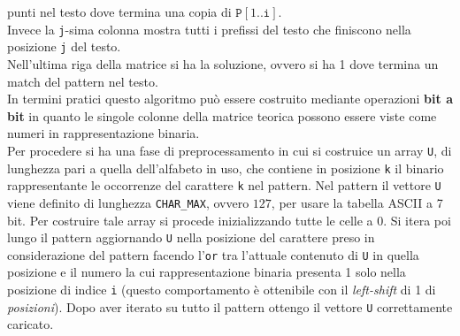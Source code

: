 \documentclass[a4paper,12pt, oneside]{article}
\begin{document}
punti nel testo dove termina una copia di
$\mathtt{P}[1..\mathtt{i}]$.\\
Invece la \texttt{j}-sima colonna mostra tutti i prefissi del testo
che finiscono nella posizione \texttt{j} del testo.\\
Nell'ultima riga della matrice si ha la soluzione, ovvero si ha 1 dove
termina un match del pattern nel testo.\\
In termini pratici questo algoritmo può essere costruito mediante
operazioni \textbf{bit a bit} in quanto le singole colonne della
matrice teorica possono essere viste come numeri in rappresentazione
binaria.\\
Per procedere si ha una fase di preprocessamento in cui si costruice
un array \texttt{U}, di lunghezza pari a quella dell'alfabeto in uso,
che contiene in posizione \texttt{k} il binario rappresentante le
occorrenze del carattere \texttt{k} nel pattern. Nel pattern il
vettore \texttt{U} viene definito di lunghezza \texttt{CHAR\_MAX},
ovvero $127$, per usare la tabella ASCII a 7 bit. Per costruire tale
array si procede inizializzando tutte le celle a 0. Si itera poi lungo
il pattern aggiornando \texttt{U} nella posizione del carattere preso
in considerazione del pattern facendo l'\texttt{or} tra l'attuale
contenuto di \texttt{U} in quella posizione e il numero la cui
rappresentazione binaria presenta 1 solo nella posizione di indice
\texttt{i} (questo comportamento è ottenibile con il
\textit{left-shift} di 1 di \textit{posizioni}). Dopo aver iterato su
tutto il pattern ottengo il vettore \texttt{U} correttamente caricato.
\end{document}
